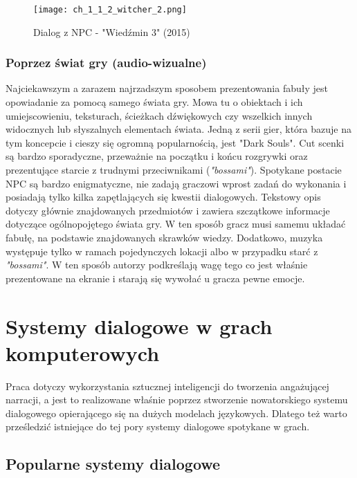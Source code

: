 \begin{figure}[h]
	\caption{Dialog z NPC - "Wiedźmin 3" (2015)}
	\texttt{[image: ch\_1\_1\_2\_witcher\_2.png]}
	\centering
	\label{fig:ch1_2_2_dialogue}
\end{figure}

\subsubsection*{Poprzez świat gry (audio-wizualne)}

Najciekawszym a zarazem najrzadszym\cite{the_evolution_of_video_games} sposobem prezentowania fabuły
jest opowiadanie za pomocą samego świata gry. Mowa tu o obiektach i ich umiejscowieniu, teksturach,
ścieżkach dźwiękowych czy wszelkich innych widocznych lub słyszalnych elementach świata. Jedną z
serii gier, która bazuje na tym koncepcie i cieszy się ogromną popularnością, jest "Dark Souls".
Cut scenki są bardzo sporadyczne, przeważnie na początku i końcu rozgrywki oraz prezentujące starcie
z trudnymi przeciwnikami (\textit{"bossami"}). Spotykane postacie NPC są bardzo enigmatyczne, nie
zadają graczowi wprost zadań do wykonania i posiadają tylko kilka zapętlających się kwestii
dialogowych. Tekstowy opis dotyczy głównie znajdowanych przedmiotów i zawiera szczątkowe informacje
dotyczące ogólnopojętego świata gry. W ten sposób gracz musi samemu układać fabułę, na podstawie
znajdowanych skrawków wiedzy. Dodatkowo, muzyka występuje tylko w ramach pojedynczych lokacji albo
w przypadku starć z \textit{"bossami"}. W ten sposób autorzy podkreślają wagę tego co jest właśnie
prezentowane na ekranie i starają się wywołać u gracza pewne emocje.

\newpage

\section{Systemy dialogowe w grach komputerowych}\label{section:ch1_3}

Praca dotyczy wykorzystania sztucznej inteligencji do tworzenia angażującej narracji, a jest
to realizowane właśnie poprzez stworzenie nowatorskiego systemu dialogowego opierającego się
na dużych modelach językowych. Dlatego też warto prześledzić istniejące do tej pory systemy
dialogowe spotykane w grach.

\subsection{Popularne systemy dialogowe}\label{subsection:ch1_3_1}

